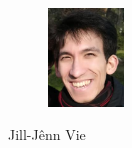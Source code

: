 \documentclass[a4paper,10pt]{article}
\begin{document}
\pagestyle{empty}
\begin{figure}
\vspace{-3mm}
\includegraphics[width=2cm]{jj.png}
\end{figure}
\noindent
{\LARGE Jill-Jênn Vie}\\[1mm]

\end{document}
